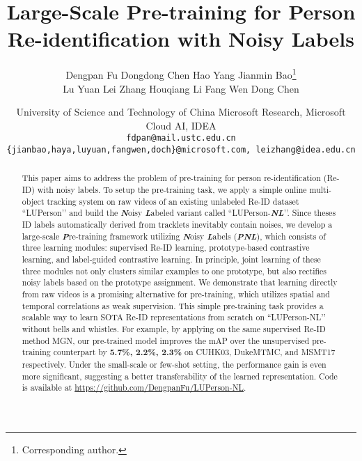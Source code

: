 \documentclass[10pt,twocolumn,letterpaper]{article}
\begin{document}
\title{Large-Scale Pre-training for Person Re-identification with Noisy Labels}

\author{Dengpan Fu \quad
		Dongdong Chen \quad
		Hao Yang \quad
		Jianmin Bao\thanks{Corresponding author.} \\
		Lu Yuan \quad
		Lei Zhang \quad
		Houqiang Li \quad
		Fang Wen  \quad
		Dong Chen
		\and 
		University of Science and Technology of China \quad Microsoft Research, Microsoft Cloud AI, IDEA  \\ {\tt\small fdpan@mail.ustc.edu.cn}   \\
		{\tt\small \{jianbao,haya,luyuan,fangwen,doch\}@microsoft.com, leizhang@idea.edu.cn}
	}

\maketitle

\begin{abstract}
This paper aims to address the problem of pre-training for person re-identification (Re-ID) with noisy labels. To setup the pre-training task, we apply a simple online multi-object tracking system on raw videos of an existing unlabeled Re-ID dataset ``LUPerson’’ and build the {\textit{\textbf{N}}}oisy {\textit{\textbf{L}}}abeled variant called ``LUPerson-{\textit{\textbf{NL}}}’’. Since theses ID labels automatically derived from tracklets inevitably contain noises, we develop a large-scale  {\textit{\textbf{P}}}re-training framework utilizing \textit{\textbf{N}}oisy \textit{\textbf{L}}abels ({\textit{\textbf{PNL}}}), which consists of three learning modules: supervised Re-ID learning, prototype-based contrastive learning, and label-guided contrastive learning. In principle, joint learning of these three modules not only clusters similar examples to one prototype, but also rectifies noisy labels based on the prototype assignment. We demonstrate that learning directly from raw videos is a promising alternative for pre-training, which utilizes spatial and temporal correlations as weak supervision. This simple pre-training task provides a scalable way to learn SOTA Re-ID representations from scratch on ``LUPerson-NL’’ without bells and whistles. For example, by applying on the same supervised Re-ID method MGN, our pre-trained model improves the mAP over the unsupervised pre-training counterpart by \textbf{5.7\%, 2.2\%, 2.3\%} on CUHK03,  DukeMTMC, and MSMT17 respectively. Under the small-scale or few-shot setting, the performance gain is even more significant, suggesting a better transferability of the learned representation. Code is available at \url{https://github.com/DengpanFu/LUPerson-NL}.
\end{abstract}
\end{document}
